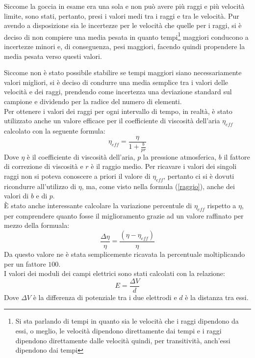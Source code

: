 \documentclass{article}
\begin{document}
Siccome la goccia in esame era una sola e non può avere più raggi e più velocità limite, sono stati, pertanto, presi i valori medi tra i raggi e tra le velocità. Pur avendo a disposizione sia le incertezze per le velocità che quelle per i raggi, si è deciso di non compiere una media pesata in quanto tempi\footnote{Si sta parlando di tempi in quanto sia le velocità che i raggi dipendono da essi, o meglio, le velocità dipendono direttamente dai tempi e i raggi dipendono direttamente dalle velocità quindi, per transitività, anch'essi dipendono dai tempi} maggiori conducono a incertezze minori e, di conseguenza, pesi maggiori, facendo quindi propendere la media pesata verso questi valori.

Siccome non è stato possibile stabilire se tempi maggiori siano necessariamente valori migliori, si è deciso di condurre una media semplice tra i valori delle velocità e dei raggi, prendendo come incertezza una deviazione standard sul campione e dividendo per la radice del numero di elementi.\\

Per ottenere i valori dei raggi per ogni intervallo di tempo, in realtà, è stato utilizzato anche un valore efficace per il coefficiente di viscosità dell'aria $\eta_{eff}$ calcolato con la seguente formula:
\begin{equation}
	\eta_{eff}=\frac{\eta}{1+\frac b{pr}}
\end{equation}
Dove $\eta$ è il coefficiente di viscosità dell'aria, $p$ la pressione atmosferica, $b$ il fattore di correzione di viscosità e $r$ è il raggio medio. Per ricavare i valori dei singoli raggi non si poteva conoscere a priori il valore di $\eta_{eff}$, pertanto ci si è dovuti ricondurre all'utilizzo di $\eta$, ma, come visto nella formula (\ref{raggio}), anche dei valori di $b$ e di $p$.\\

È stato anche interessante calcolare la variazione percentule di $\eta_{eff}$ rispetto a $\eta$, per comprendere quanto fosse il miglioramento grazie ad un valore raffinato per mezzo della formuala:
\begin{equation}
	\frac{\Delta \eta}{\eta}=\frac{(\eta-\eta_{eff})}{\eta}
\end{equation}
Da questo valore ne è stata semplicemente ricavata la percentuale moltiplicando per un fattore $100$.\\

I valori dei moduli dei campi elettrici sono stati calcolati con la relazione:
\begin{equation}
	E=\frac{\Delta V}{d}
\end{equation}
Dove $\Delta V$ è la differenza di potenziale tra i due elettrodi e $d$ è la distanza tra essi.
\end{document}
